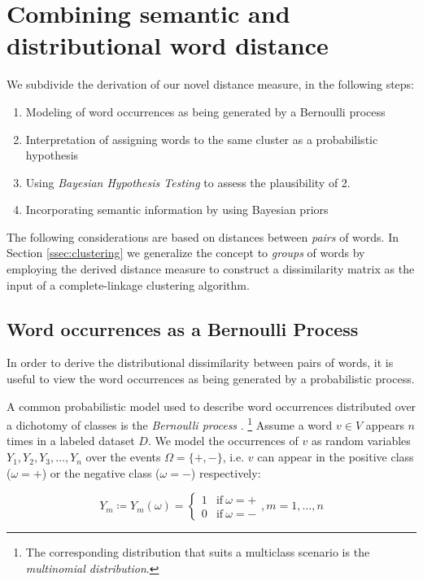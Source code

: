 \section{Combining semantic and distributional word distance}
\label{sec:distance-measure}

We subdivide the derivation of our novel distance measure, in the following
steps:
 
 \begin{enumerate}
  \item Modeling of word occurrences as being generated by a Bernoulli
  process
  \item Interpretation of assigning words to the same cluster as a probabilistic hypothesis
  \item Using \emph{Bayesian Hypothesis Testing} to assess the plausibility of
  2.
  \item Incorporating semantic information by using Bayesian priors   
\end{enumerate}

The following considerations are based on distances between \emph{pairs} of words. In
Section \ref{ssec:clustering} we generalize the concept to \emph{groups} of words by
employing the derived distance measure to construct a dissimilarity matrix
as the input of a complete-linkage clustering algorithm. 

\subsection{Word occurrences as a Bernoulli Process}
\label{sec:bernoulli}
In order to derive the distributional dissimilarity between pairs of words, it
is useful to view the word occurrences as being generated by a probabilistic
process. 

A common probabilistic model used to describe word occurrences distributed over
a dichotomy of classes is the \emph{Bernoulli process} \cite{Joachims1998}.
\footnote{The corresponding distribution that suits a multiclass scenario is the \emph{multinomial
distribution}.} Assume a word $v \in V$ appears $n$ times in a labeled dataset
$D$.
We model the occurrences of $v$ as random variables $Y_1, Y_2, Y_3, \ldots, Y_n$ over the events $\Omega = \{ +, -\}$, 
i.e. $v$ can appear in the positive class ($\omega = +$) or the negative
class ($\omega = -$) respectively:

\begin{equation*}
	Y_m \coloneqq Y_m(\omega) = \begin{cases} 1 & \mathrm{if~} \omega = \mathrm{+}
	\\
	0 & \mathrm{if~} \omega = \mathrm{-} \end{cases}, m = 1,\ldots,n
\end{equation*}

